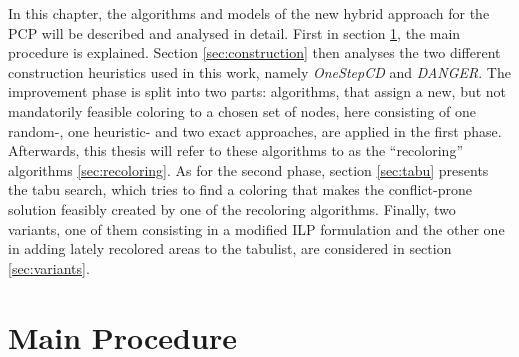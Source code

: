In this chapter, the algorithms and models of the new hybrid approach for the PCP will be described and analysed in detail. First in section \ref{sec:mainalg}, the main procedure is explained. Section \ref{sec:construction} then analyses the two different construction heuristics used in this work, namely \textit{OneStepCD} and \textit{DANGER}. The improvement phase is split into two parts: algorithms, that assign a new, but not mandatorily feasible coloring to a chosen set of nodes, here consisting of one random-, one heuristic- and two exact approaches, are applied in the first phase. Afterwards, this thesis will refer to these algorithms to as the ``recoloring'' algorithms \ref{sec:recoloring}. As for the second phase, section \ref{sec:tabu} presents the tabu search, which tries to find a coloring that makes the conflict-prone solution feasibly created by one of the recoloring algorithms. Finally, two variants, one of them consisting in a modified ILP formulation and the other one in adding lately recolored areas to the tabulist, are considered in section \ref{sec:variants}.

\section{Main Procedure}
\label{sec:mainalg}

